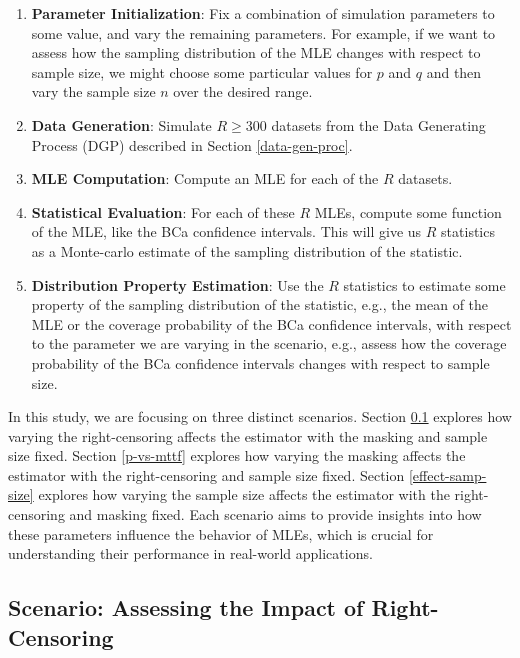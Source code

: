 \documentclass[
]{article}
\theoremstyle{definition}
\theoremstyle{plain}
\theoremstyle{definition}
\theoremstyle{definition}
\theoremstyle{definition}
\theoremstyle{definition}
\theoremstyle{remark}
\begin{document}
\begin{enumerate}
\def\labelenumi{\arabic{enumi}.}
\item
  \textbf{Parameter Initialization}: Fix a combination of simulation parameters to
  some value, and vary the remaining parameters. For example, if we want to
  assess how the sampling distribution of the MLE changes with respect to
  sample size, we might choose some particular values for \(p\) and \(q\) and then
  vary the sample size \(n\) over the desired range.
\item
  \textbf{Data Generation}: Simulate \(R \geq 300\) datasets from the Data Generating
  Process (DGP) described in Section \ref{data-gen-proc}.
\item
  \textbf{MLE Computation}: Compute an MLE for each of the \(R\) datasets.
\item
  \textbf{Statistical Evaluation}: For each of these \(R\) MLEs, compute some function
  of the MLE, like the BCa confidence intervals. This will give us \(R\)
  statistics as a Monte-carlo estimate of the sampling distribution of the
  statistic.
\item
  \textbf{Distribution Property Estimation}: Use the \(R\) statistics to estimate some
  property of the sampling distribution of the statistic, e.g., the mean of the
  MLE or the coverage probability of the BCa confidence intervals, with respect
  to the parameter we are varying in the scenario, e.g., assess how the
  coverage probability of the BCa confidence intervals changes with respect to
  sample size.
\end{enumerate}

In this study, we are focusing on three distinct scenarios.
Section \ref{effect-censoring} explores how varying the right-censoring affects
the estimator with the masking and sample size fixed. Section \ref{p-vs-mttf}
explores how varying the masking affects the estimator with the right-censoring
and sample size fixed. Section \ref{effect-samp-size} explores how varying
the sample size affects the estimator with the right-censoring and masking fixed.
Each scenario aims to provide insights into how these parameters influence the
behavior of MLEs, which is crucial for understanding their performance in
real-world applications.

\hypertarget{effect-censoring}{%
\subsection{Scenario: Assessing the Impact of Right-Censoring}\label{effect-censoring}}
\end{document}
